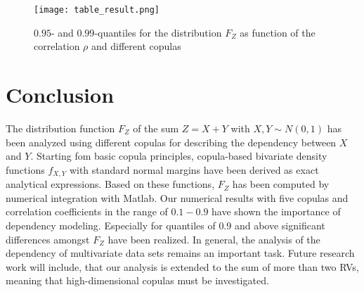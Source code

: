 \documentclass[a4paper]{article}
\begin{document}
 
\begin{figure}[h]
	\texttt{[image: table\_result.png]}
	\caption{\small $0.95$- and $0.99$-quantiles for the distribution $F_Z$ as function of the correlation $\rho$ and different copulas}
	\label{fig:table_Result}       
\end{figure}




\section{Conclusion}
The distribution function $F_Z$ of the sum $Z=X+Y$ with $X, Y \sim N(0,1)$ has been analyzed using different copulas for describing the dependency between $X$ and $Y$. Starting fom basic copula principles, copula-based bivariate density functions $f_{X,Y}$ with standard normal margins have been derived as exact analytical expressions. Based on these functions, $F_Z$ has been computed by numerical integration with Matlab. Our numerical results with five copulas and correlation coefficients in the range of $0.1-0.9$ have shown the importance of dependency modeling. Especially for quantiles of $0.9$ and above significant differences amongst $F_Z$ have been realized.  
In general, the analysis of the dependency of multivariate data sets remains an important task. Future research work will include, that our analysis is extended to the sum of more than two RVs, meaning that high-dimensional copulas must be investigated.










\end{document}
